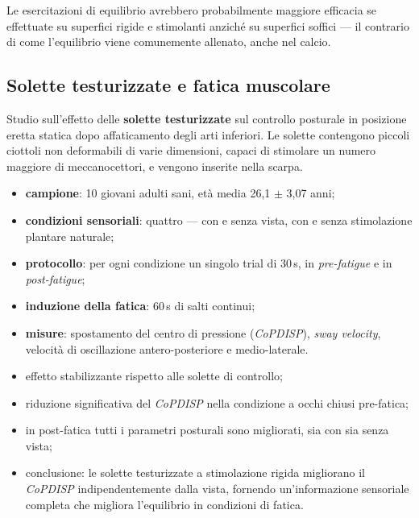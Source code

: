 Le esercitazioni di equilibrio avrebbero probabilmente maggiore efficacia se effettuate su superfici
  rigide e stimolanti anziché su superfici soffici --- il contrario di come l'equilibrio viene
  comunemente allenato, anche nel calcio.

\subsection{Solette testurizzate e fatica muscolare}

Studio sull'effetto delle \textbf{solette testurizzate} sul controllo posturale in posizione eretta
statica dopo affaticamento degli arti inferiori. Le solette contengono piccoli ciottoli non
deformabili di varie dimensioni, capaci di stimolare un numero maggiore di meccanocettori, e
vengono inserite nella scarpa.

\begin{itemize}
  \item \textbf{campione}: 10 giovani adulti sani, età media 26,1 $\pm$ 3,07 anni;
  \item \textbf{condizioni sensoriali}: quattro --- con e senza vista, con e senza stimolazione
    plantare naturale;
  \item \textbf{protocollo}: per ogni condizione un singolo trial di 30\,s, in \textit{pre-fatigue}
    e in \textit{post-fatigue};
  \item \textbf{induzione della fatica}: 60\,s di salti continui;
  \item \textbf{misure}: spostamento del centro di pressione (\textit{CoPDISP}), \textit{sway
    velocity}, velocità di oscillazione antero-posteriore e medio-laterale.
\end{itemize}

\begin{itemize}
  \item effetto stabilizzante rispetto alle solette di controllo;
  \item riduzione significativa del \textit{CoPDISP} nella condizione a occhi chiusi pre-fatica;
  \item in post-fatica tutti i parametri posturali sono migliorati, sia con sia senza vista;
  \item conclusione: le solette testurizzate a stimolazione rigida migliorano il \textit{CoPDISP}
    indipendentemente dalla vista, fornendo un'informazione sensoriale completa che migliora
    l'equilibrio in condizioni di fatica.
\end{itemize}

